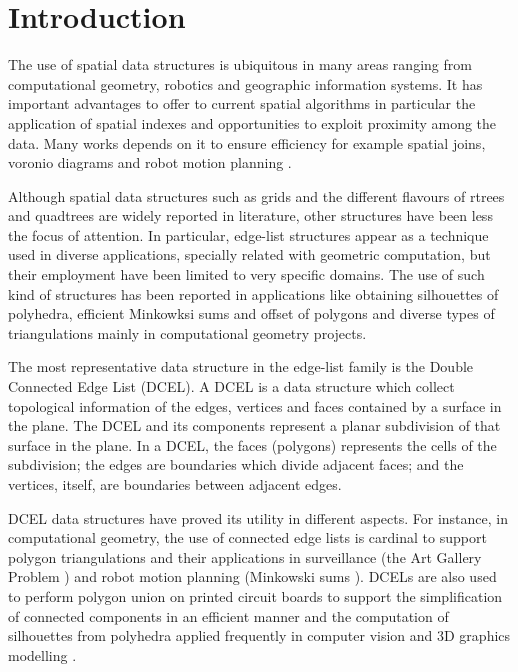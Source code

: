 \section{Introduction}
The use of spatial data structures is ubiquitous in many areas ranging from computational geometry, robotics and geographic information systems.  It has important advantages to offer to current spatial algorithms in particular the application of spatial indexes and opportunities to exploit proximity among the data.  Many works depends on it to ensure efficiency for example spatial joins, voronio diagrams and robot motion planning \cite{berg_computational_2008}.

Although spatial data structures such as grids and the different flavours of rtrees and quadtrees are widely reported in literature, other structures have been less the focus of attention.  In particular, edge-list structures appear as a technique used in diverse applications, specially related with geometric computation, but their employment have been limited to very specific domains.  The use of such kind of structures has been reported in applications like obtaining silhouettes of polyhedra, efficient Minkowksi sums and offset of polygons and diverse types of triangulations mainly in computational geometry projects.

The most representative data structure in the edge-list family is the Double Connected Edge List (DCEL).  A DCEL \cite{muller_finding_1978, preparata_computational_1985} is a data structure which collect topological information of the edges, vertices and faces contained by a surface in the plane.  The DCEL and its components represent a planar subdivision of that surface in the plane. In a DCEL, the faces (polygons) represents the cells of the subdivision; the edges are boundaries which divide adjacent faces; and the vertices, itself, are boundaries between adjacent edges.

DCEL data structures have proved its utility in different aspects.  For instance, in computational geometry, the use of connected edge lists is cardinal to support polygon triangulations and their applications in surveillance (the Art Gallery Problem \cite{chvatal_combinatorial_1975, orourke_art_1987}) and robot motion planning (Minkowski sums \cite{berg_computational_2008, chew_convex_1993}).  DCELs are also used to perform polygon union on printed circuit boards to support the simplification of connected components in an efficient manner \cite{fogel_cgal_2012} and the computation of silhouettes from polyhedra \cite{fogel_cgal_2012, berberich_arrangements_2010} applied frequently in computer vision and 3D graphics modelling \cite{boguslawski_modelling_2011}.


